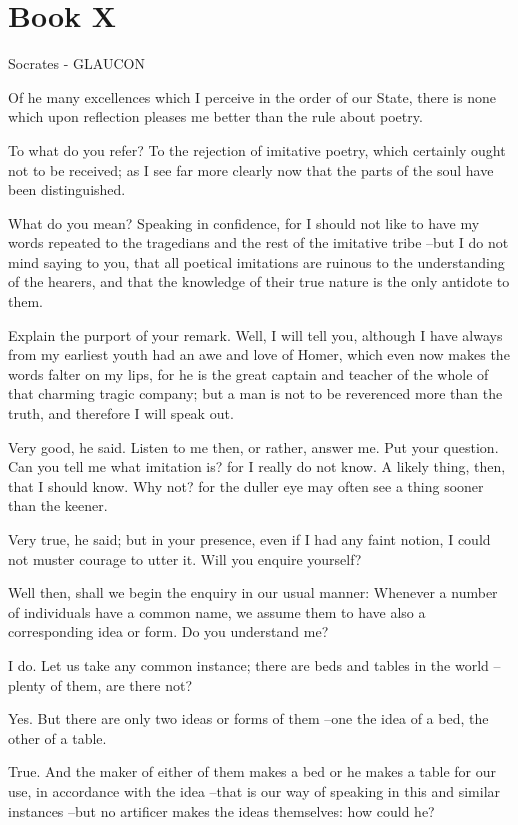 \chapter{Book X}

Socrates - GLAUCON

Of he many excellences which I perceive in the order of our State, there is none which upon reflection pleases me better than the rule about poetry.

To what do you refer?
To the rejection of imitative poetry, which certainly ought not to be received; as I see far more clearly now that the parts of the soul have been distinguished.

What do you mean?
Speaking in confidence, for I should not like to have my words repeated to the tragedians and the rest of the imitative tribe --but I do not mind saying to you, that all poetical imitations are ruinous to the understanding of the hearers, and that the knowledge of their true nature is the only antidote to them.

Explain the purport of your remark.
Well, I will tell you, although I have always from my earliest youth had an awe and love of Homer, which even now makes the words falter on my lips, for he is the great captain and teacher of the whole of that charming tragic company; but a man is not to be reverenced more than the truth, and therefore I will speak out.

Very good, he said.
Listen to me then, or rather, answer me.
Put your question.
Can you tell me what imitation is? for I really do not know.
A likely thing, then, that I should know.
Why not? for the duller eye may often see a thing sooner than the keener.

Very true, he said; but in your presence, even if I had any faint notion, I could not muster courage to utter it. Will you enquire yourself?

Well then, shall we begin the enquiry in our usual manner: Whenever a number of individuals have a common name, we assume them to have also a corresponding idea or form. Do you understand me?

I do.
Let us take any common instance; there are beds and tables in the world --plenty of them, are there not?

Yes.
But there are only two ideas or forms of them --one the idea of a bed, the other of a table.

True.
And the maker of either of them makes a bed or he makes a table for our use, in accordance with the idea --that is our way of speaking in this and similar instances --but no artificer makes the ideas themselves: how could he?

